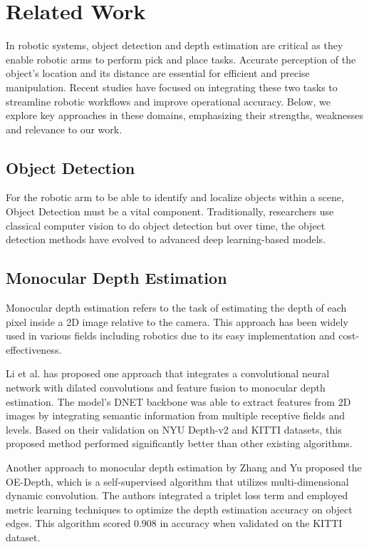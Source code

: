 \section{Related Work}
In robotic systems, object detection and depth estimation are critical as they enable robotic arms to perform pick and place tasks. Accurate perception of the object’s location and its distance are essential for efficient and precise manipulation. Recent studies have focused on integrating these two tasks to streamline robotic workflows and improve operational accuracy.
Below, we explore key approaches in these domains, emphasizing their strengths, weaknesses and relevance to our work.

\vspace{10pt}

\subsection{Object Detection}
For the robotic arm to be able to identify and localize objects within a scene, Object Detection must be a vital component. Traditionally, researchers use classical computer vision to do object detection but over time, the object detection methods have evolved to advanced deep learning-based models.

\subsection{Monocular Depth Estimation}
Monocular depth estimation refers to the task of estimating the depth of each pixel inside a 2D image relative to the camera. This approach has been widely used in various fields including robotics due to its easy implementation and cost-effectiveness.

\vspace{10pt}

Li et al. \cite{huiyi_li_2024} has proposed one approach that integrates a convolutional neural network with dilated convolutions and feature fusion to monocular depth estimation. The model’s DNET backbone was able to extract features from 2D images by integrating semantic information from multiple receptive fields and levels. Based on their validation on NYU Depth-v2 and KITTI datasets, this proposed method performed significantly better than other existing algorithms.

\vspace{10pt}

Another approach to monocular depth estimation by Zhang and Yu \cite{rui_zhang_2024} proposed the OE-Depth, which is a self-supervised algorithm that utilizes multi-dimensional dynamic convolution. The authors integrated a triplet loss term and employed metric learning techniques to optimize the depth estimation accuracy on object edges. This algorithm scored 0.908 in accuracy when validated on the KITTI dataset.

